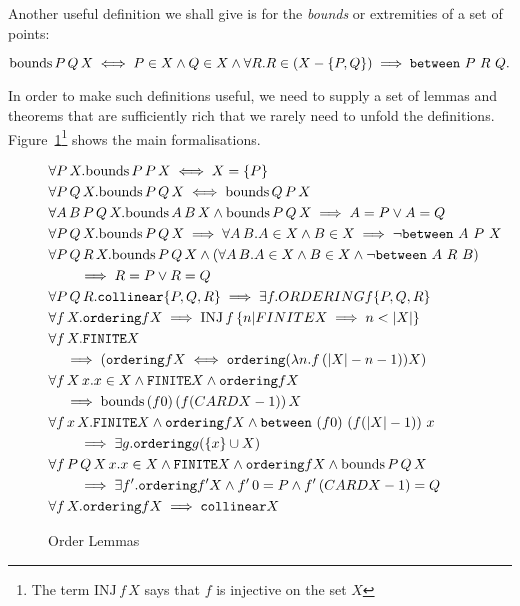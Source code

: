 Another useful definition we shall give is for the \emph{bounds} or extremities of a set of points:

\begin{displaymath}
\text{bounds}\,P\,Q\,X \iff P \in X \wedge Q \in X \wedge \forall R. R\in (X - \{P,Q\}) \implies \texttt{between}\ P\ R\ Q.
\end{displaymath}

In order to make such definitions useful, we need to supply a set of lemmas and theorems that are sufficiently rich that we rarely need to unfold the definitions. Figure~\ref{fig:OrderLemmas}\footnote{The term $\text{INJ}\,f\,X$ says that $f$ is injective on the set $X$} shows the main formalisations.

\begin{figure}
\begin{align}
&\forall P\,X. \text{bounds}\,P\,P\,X \iff X = \{P\}\\
&\forall P\,Q\,X. \text{bounds}\,P\,Q\,X \iff \text{bounds}\,Q\,P\,X\\
&\forall A\,B\,P\,Q\,X. \text{bounds}\,A\,B\,X \wedge \text{bounds}\,P\,Q\,X \implies A = P \vee A = Q\\
&\forall P\,Q\,X. \text{bounds}\,P\,Q\,X \implies \forall A\,B. A \in X \wedge B \in X \implies \neg\texttt{between}\ A\ P\ X\\
&\forall P\,Q\,R\,X. \text{bounds}\,P\,Q\,X \wedge (\forall A\,B. A \in X \wedge B \in X \wedge \neg\texttt{between}\ A\ R\ B)\notag\\
&\qquad\implies R = P \vee R = Q\\
&\forall P\,Q\,R. \texttt{collinear} \{P,Q,R\} \implies \exists f. ORDERING f \{P,Q,R\}\\
&\forall f\,X. \texttt{ordering}{f}{X} \implies \text{INJ}\,f\,\{ n \vert FINITE X \implies n < |X| \}\\
&\forall f\,X. \texttt{FINITE} X \label{eq:OrderRev}\\
&\quad\implies (\texttt{ordering}{f}{X} \iff \texttt{ordering} (\lambda n. f\,(|X| - n - 1)) X)\\
&\forall f\,X\,x. x \in X \wedge \texttt{FINITE} X \wedge \texttt{ordering}{f}{X}\label{eq:OrderBounds}\\
&\quad\implies \text{bounds}\,(f 0)\,(f (CARD X - 1))\,X\\
&\forall f\,x\,X. \texttt{FINITE} X \wedge \texttt{ordering}{f}{X} \wedge \texttt{between}\ (f 0)\ (f (|X| - 1))\ x\notag\\
&\qquad \implies \exists g. \texttt{ordering}{g}{(\{x\} \cup X)}\label{eq:OrderExtend}\\
&\forall f\,P\,Q\,X\,x. x \in X \wedge \texttt{FINITE} X \wedge \texttt{ordering}{f}{X} \wedge \text{bounds}\,P\,Q\,X\notag\\
&\qquad\implies\exists f'. \texttt{ordering}{f'}{X} \wedge f'\,0 = P \wedge f'\,(CARD X - 1) = Q\label{eq:ChooseOrder}\\
&\forall f\,X. \texttt{ordering}{f}{X} \implies \texttt{collinear} X
\end{align}
\caption{Order Lemmas}
\label{fig:OrderLemmas}
\end{figure}

